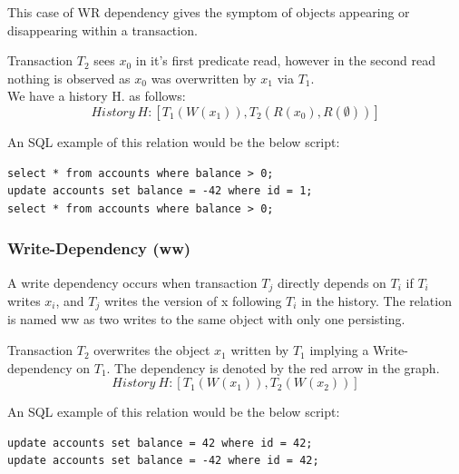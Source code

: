 \documentclass[a4paper,10pt,titlepage]{report}
\begin{document}
This case of WR dependency gives the symptom of objects appearing or disappearing within a transaction. 

\vspace{2mm}

\vspace{2mm}


Transaction $T_2$ sees $x_0$ in it's first predicate read, however in the second read nothing is observed as $x_0$ was overwritten by $x_1$ via $T_1$. \\

We have a history H. as follows:
\begin{equation}
    History\ H: [T_1(W(x_1)), T_2(R(x_0),R(\emptyset))]
\end{equation}

An SQL example of this relation would be the below script:

\begin{lstlisting}
select * from accounts where balance > 0;
update accounts set balance = -42 where id = 1;
select * from accounts where balance > 0;
\end{lstlisting}
        
        
\subsubsection{Write-Dependency (ww)}
A write dependency occurs when transaction $T_j$ directly depends on $T_i$ if $T_i$ writes $x_i$, and $T_j$ writes the version of x following $T_i$ in the history. The relation is named ww as two writes to the same object with only one persisting.

\vspace{2mm}

\vspace{2mm}


Transaction $T_2$ overwrites the object $x_1$ written by $T_1$ implying a Write-dependency on $T_1$. The dependency is denoted by the red arrow in the graph. \\

\begin{equation}
    History\ H: [T_1(W(x_1)), T_2(W(x_2))]
\end{equation}

An SQL example of this relation would be the below script:

\begin{lstlisting}
update accounts set balance = 42 where id = 42;
update accounts set balance = -42 where id = 42;
\end{lstlisting}
\end{document}
